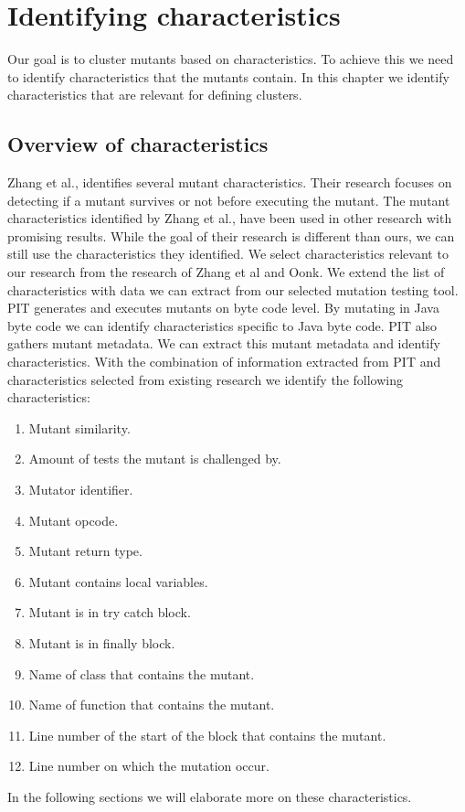 \documentclass[../main]{subfiles}
\begin{document}
\section{Identifying characteristics}
\label{ch:clustering_characteristics}
Our goal is to cluster mutants based on characteristics. 
To achieve this we need to identify characteristics that the mutants contain. 
In this chapter we identify characteristics that are relevant for defining clusters. 

\subsection{Overview of characteristics}
Zhang et al., identifies several mutant characteristics\cite{Zhang2019PredictiveTesting}. 
Their research focuses on detecting if a mutant survives or not before executing the mutant.
The mutant characteristics identified by Zhang et al., have been used in other research with promising results\cite{Oonk2021}.
While the goal of their research is different than ours, we can still use the characteristics they identified.
We select characteristics relevant to our research from the research of Zhang et al and Oonk.
We extend the list of characteristics with data we can extract from our selected mutation testing tool. 
\newline
PIT generates and executes mutants on byte code level\cite{pitestBytecode}.
By mutating in Java byte code we can identify characteristics specific to Java byte code.
PIT also gathers mutant metadata.
We can extract this mutant metadata and identify characteristics. 
With the combination of information extracted from PIT and characteristics selected from existing research we identify the following characteristics:
\begin{enumerate}
    \item Mutant similarity.
    \item Amount of tests the mutant is challenged by.
    \item Mutator identifier.
    \item Mutant opcode.
    \item Mutant return type.
    \item Mutant contains local variables.
    \item Mutant is in try catch block.
    \item Mutant is in finally block.
    \item Name of class that contains the mutant.
    \item Name of function that contains the mutant.
    \item Line number of the start of the block that contains the mutant.
    \item Line number on which the mutation occur.
\end{enumerate}
In the following sections we will elaborate more on these characteristics.
\end{document}
